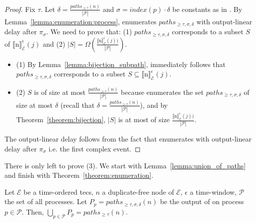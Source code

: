 \begin{proof}
  Fix $\tau$. Let $\delta = \frac{paths_{\ge \tau}(n)}{|\mathcal{P}|}$ and $\sigma = index(p) \cdot \delta$ be constants as in . By Lemma~\ref{lemma:enumeration:process},  enumerates $paths_{\ge \tau, \sigma, \delta}$ with output-linear delay after $\pi_{\sigma}$. We need to prove that: (1) $paths_{\ge \tau, \sigma, \delta}$ corresponds to a subset $S$ of ${\llbracket \text{n} \rrbracket}^{\epsilon}_{\mathcal{E}}(j)$ and (2) $|S| = \Omega(\frac{{\llbracket \text{n} \rrbracket}^{\epsilon}_{\mathcal{E}}(j))}{|\mathcal{P}|})$.

 \begin{itemize}
   \item (1) By Lemma~\ref{lemma:bijection_subpath}, immediately follows that $paths_{\ge \tau, \sigma, \delta}$ corresponds to a subset $S \subseteq {\llbracket \text{n} \rrbracket}^{\epsilon}_{\mathcal{E}}(j)$.
   \item (2) $S$ is of size at most $\frac{paths_{\ge \tau}(n)}{|\mathcal{P}|}$ because  enumerates the set $paths_{\ge \tau, \sigma, \delta}$ of size at most $\delta$ (recall that $\delta = \frac{paths_{\ge \tau}(n)}{|\mathcal{P}|}$), and by Theorem~\ref{theorem:bijection}, $|S|$ is at most of size $\frac{{\llbracket \text{n} \rrbracket}^{\epsilon}_{\mathcal{E}}(j))}{|\mathcal{P}|}$.
 \end{itemize}

 The output-linear delay follows from the fact that  enumerates with output-linear delay after $\pi_{\sigma}$ i.e. the first complex event.
\end{proof}

There is only left to prove (3). We start with Lemma~\ref{lemma:union_of_paths} and finish with Theorem~\ref{theorem:enumeration}.

\begin{lemma}\label{lemma:union_of_paths}
  Let $\mathcal{E}$ be a time-ordered \acrshort{tecs}, $n$ a duplicate-free node of $\mathcal{E}$, $\epsilon$ a time-window, $\mathcal{P}$ the set of all processes. Let $P_{p} = paths_{\ge \tau, \sigma, \delta}(n)$ be the output of  on process $p \in \mathcal{P}$. Then, $\bigcup\limits_{p \in \mathcal{P}} P_{p} = paths_{\ge \tau}(n)$.
\end{lemma}

